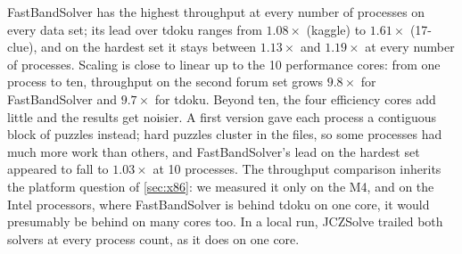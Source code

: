 \documentclass[11pt]{article}
\theoremstyle{definition}
\theoremstyle{plain}
\begin{document}
FastBandSolver has the highest throughput at every number of processes on every data set; its lead over tdoku ranges from $1.08\times$ (kaggle) to $1.61\times$ (17-clue), and on the hardest set it stays between
$1.13\times$ and $1.19\times$ at every number of processes. Scaling is close to linear up to the 10 performance cores: from one process to ten, throughput on the second forum set
grows $9.8\times$ for FastBandSolver and $9.7\times$ for tdoku. Beyond ten, the four efficiency cores add little and the
results get noisier. A first version gave each process a contiguous block of puzzles instead; hard puzzles cluster in
the files, so some processes had much more work than others, and FastBandSolver's lead on the hardest set appeared to
fall to $1.03\times$ at 10 processes. The throughput comparison inherits the platform question of \cref{sec:x86}: we measured it only on the M4, and on
the Intel processors, where FastBandSolver is behind tdoku on one core, it would presumably be behind on many cores too. In a local run, JCZSolve trailed
both solvers at every process count, as it does on one core.
\end{document}
